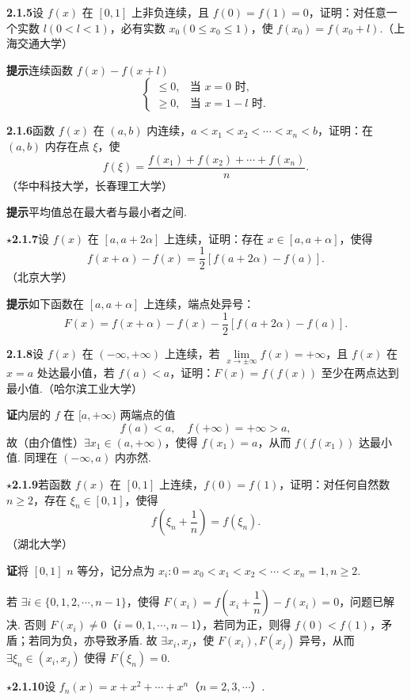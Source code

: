 \documentclass[UTF8,12pt,a4paper,fontset=fandol]{ctexart}
\begin{document}
\noindent\textbf{2.1.5}\quad 设 $f(x)$ 在 $[0,1]$ 上非负连续，且 $f(0)=f(1)=0$，证明：对任意一个实数 $l(0<l<1)$，必有实数 $x_0(0\le x_0\le1)$，使 $f(x_0)=f(x_0+l)$.（上海交通大学）

\noindent\textbf{提示}\quad 连续函数 $f(x)-f(x+l)$
\[
  \begin{cases}
    \le0, & \text{当 }x=0\text{ 时},\\
    \ge0, & \text{当 }x=1-l\text{ 时}.
  \end{cases}
\]

\noindent\textbf{2.1.6}\quad 函数 $f(x)$ 在 $(a,b)$ 内连续，$a<x_1<x_2<\cdots<x_n<b$，证明：在 $(a,b)$ 内存在点 $\xi$，使
\[
  f(\xi)=\frac{f(x_1)+f(x_2)+\cdots+f(x_n)}{n}.
\]
（华中科技大学，长春理工大学）

\noindent\textbf{提示}\quad 平均值总在最大者与最小者之间.

\noindent\textbf{$\star$2.1.7}\quad 设 $f(x)$ 在 $[a,a+2\alpha]$ 上连续，证明：存在 $x\in[a,a+\alpha]$，使得
\[
  f(x+\alpha)-f(x)=\frac12[f(a+2\alpha)-f(a)].
\tag{1}
\]
（北京大学）

\noindent\textbf{提示}\quad 如下函数在 $[a,a+\alpha]$ 上连续，端点处异号：
\[
  F(x)=f(x+\alpha)-f(x)-\frac12[f(a+2\alpha)-f(a)].
\]

\noindent\textbf{2.1.8}\quad 设 $f(x)$ 在 $(-\infty,+\infty)$ 上连续，若 $\lim\limits_{x\to\pm\infty}f(x)=+\infty$，且 $f(x)$ 在 $x=a$ 处达最小值，若 $f(a)<a$，证明：$F(x)=f(f(x))$ 至少在两点达到最小值.（哈尔滨工业大学）

\noindent\textbf{证}\quad 内层的 $f$ 在 $[a,+\infty)$ 两端点的值
\[
  f(a)<a,\quad f(+\infty)=+\infty>a,
\]
故（由介值性）$\exists x_1\in(a,+\infty)$，使得 $f(x_1)=a$，从而 $f(f(x_1))$ 达最小值. 同理在 $(-\infty,a)$ 内亦然.

\noindent\textbf{$\star$2.1.9}\quad 若函数 $f(x)$ 在 $[0,1]$ 上连续，$f(0)=f(1)$，证明：对任何自然数 $n\ge2$，存在 $\xi_n\in[0,1]$，使得
\[
  f\left(\xi_n+\frac1n\right)=f(\xi_n).
\]
（湖北大学）

\noindent\textbf{证}\quad 将 $[0,1]$ $n$ 等分，记分点为 $x_i:0=x_0<x_1<x_2<\cdots<x_n=1,n\ge2$.

若 $\exists i\in\{0,1,2,\cdots,n-1\}$，使得 $F(x_i)=f\left(x_i+\dfrac1n\right)-f(x_i)=0$，问题已解决. 否则 $F(x_i)\ne0$（$i=0,1,\cdots,n-1$），若同为正，则得 $f(0)<f(1)$，矛盾；若同为负，亦导致矛盾. 故 $\exists x_i,x_j$，使 $F(x_i),F(x_j)$ 异号，从而 $\exists\xi_n\in(x_i,x_j)$ 使得 $F(\xi_n)=0$.

\noindent\textbf{$\star$2.1.10}\quad 设 $f_n(x)=x+x^2+\cdots+x^n$（$n=2,3,\cdots$）.
\end{document}
